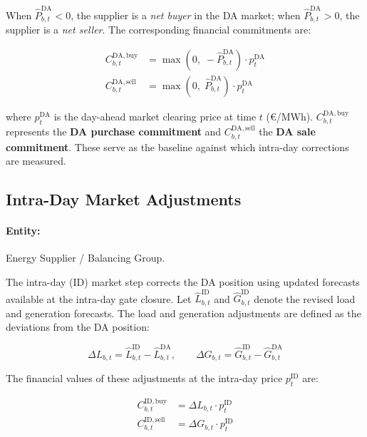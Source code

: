 When $\hat{P}^{\mathrm{DA}}_{b,t} < 0$, the supplier is a \emph{net buyer} in the DA market; when $\hat{P}^{\mathrm{DA}}_{b,t} > 0$, the supplier is a \emph{net seller}. The corresponding financial commitments are:

\begin{align}
    C^{\mathrm{DA,buy}}_{b,t}  &= \max\!\left(0,\; -\hat{P}^{\mathrm{DA}}_{b,t}\right) \cdot p^{\mathrm{DA}}_t
    \label{eq:da_buy} \\[4pt]
    C^{\mathrm{DA,sell}}_{b,t} &= \max\!\left(0,\; \hat{P}^{\mathrm{DA}}_{b,t}\right) \cdot p^{\mathrm{DA}}_t
    \label{eq:da_sell}
\end{align}

\noindent where $p^{\mathrm{DA}}_t$ is the day-ahead market clearing price at time $t$ (\euro/MWh). $C^{\mathrm{DA,buy}}_{b,t}$ represents the \textbf{DA purchase commitment} and $C^{\mathrm{DA,sell}}_{b,t}$ the \textbf{DA sale commitment}. These serve as the baseline against which intra-day corrections are measured.

\subsection{Intra-Day Market Adjustments}
\label{sec:kpi_id}

\paragraph{Entity:} Energy Supplier / Balancing Group.

The intra-day (ID) market step corrects the DA position using updated forecasts available at the intra-day gate closure. Let $\hat{L}^{\mathrm{ID}}_{b,t}$ and $\hat{G}^{\mathrm{ID}}_{b,t}$ denote the revised load and generation forecasts. The load and generation adjustments are defined as the deviations from the DA position:

\begin{equation}
    \Delta L_{b,t} = \hat{L}^{\mathrm{ID}}_{b,t} - \hat{L}^{\mathrm{DA}}_{b,t}, \qquad
    \Delta G_{b,t} = \hat{G}^{\mathrm{ID}}_{b,t} - \hat{G}^{\mathrm{DA}}_{b,t}
    \label{eq:id_adj}
\end{equation}

The financial values of these adjustments at the intra-day price $p^{\mathrm{ID}}_t$ are:

\begin{align}
    C^{\mathrm{ID,buy}}_{b,t}  &= \Delta L_{b,t} \cdot p^{\mathrm{ID}}_t
    \label{eq:id_buy} \\[4pt]
    C^{\mathrm{ID,sell}}_{b,t} &= \Delta G_{b,t} \cdot p^{\mathrm{ID}}_t
    \label{eq:id_sell}
\end{align}

